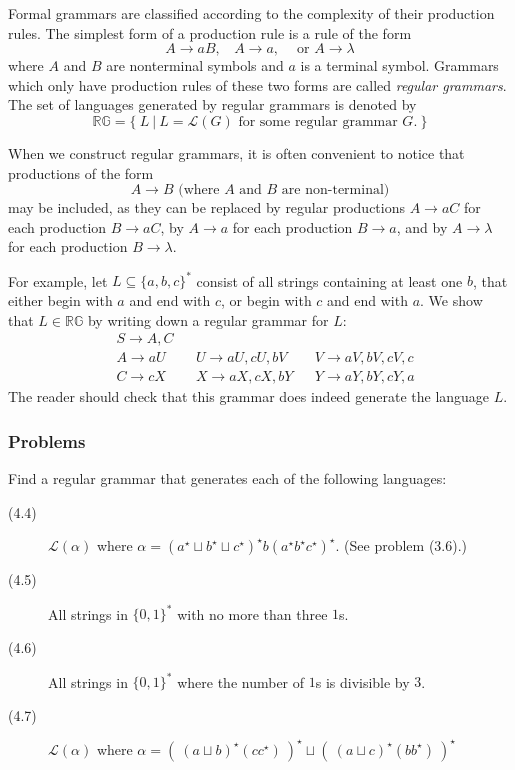 \documentclass{article}
\newcommand{\El}{\mathcal L}
\begin{document}
Formal grammars are classified according to the complexity of their production rules. The simplest form of a production rule is a rule of the form
\begin{equation*}
A \to aB, \ \ \ \ A \to a, \ \ \ \ \text{ or } A \to \lambda
\end{equation*}
where $A$ and $B$ are nonterminal symbols and $a$ is a terminal symbol. Grammars which only have production rules of these two forms are called \emph{regular grammars}. The set of languages generated by regular grammars is denoted by
\begin{equation*}
\mathbb{RG} = \{ \ L\ |\ L = \El(G) \text{ for some regular grammar $G$.} \ \}
\end{equation*}

When we construct regular grammars, it is often convenient to notice that productions of the form
\begin{equation*}
A \to B \text{  (where $A$ and $B$ are non-terminal)}
\end{equation*}
may be included, as they can be replaced by regular productions $A \to aC$ for each production $B \to aC$, by $A \to a$ for each production $B \to a$, and by $A \to \lambda$ for each production $B \to \lambda$.

For example, let $L \subseteq \{a,b,c\}^*$ consist of all strings containing at least one $b$, that either begin with $a$ and end with $c$, or begin with $c$ and end with $a$. We show that $L \in \mathbb{RG}$ by writing down a regular grammar for $L$:
\begin{align*}
& S \to A,C \\
& A \to aU & & U \to aU,cU,bV & & V \to aV,bV,cV,c \\
& C \to cX & & X \to aX,cX,bY & & Y \to aY,bY,cY,a
\end{align*}
The reader should check that this grammar does indeed generate the language $L$.


\subsubsection*{Problems}

Find a regular grammar that generates each of the following languages:

\begin{description}
  \item[(4.4)] $\El(\alpha)$ where $\alpha = (a^\star \sqcup b^\star \sqcup c^\star)^\star b(a^\star b^\star c^\star)^\star$. (See problem (3.6).)
  \item[(4.5)] All strings in $\{0,1\}^*$ with no more than three $1$s.
  \item[(4.6)] All strings in $\{0,1\}^*$ where the number of $1$s is divisible by $3$.
  \item[(4.7)] $\El(\alpha)$ where $\alpha = (\ (a \sqcup b)^\star (cc^\star)\ )^\star \sqcup (\ (a \sqcup c)^\star (bb^\star)\ )^\star$
\end{description}
\end{document}
